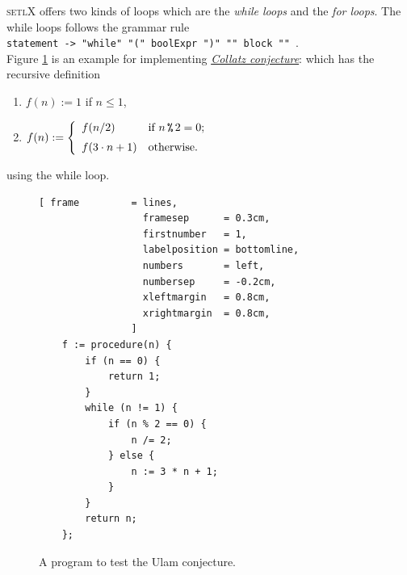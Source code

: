 \documentclass[11pt]{report}
\begin{document}
\textsc{setlX} offers two kinds of loops which are the \textsl{while loops} and the \textsl{for loops}. The while loops follows the grammar rule
\\[0.2cm]
\hspace*{1.3cm}
\texttt{statement -> "while" "(" boolExpr ")" "{" block "}" }.
\\[0.2cm]
Figure \ref{fig:ulam.stlx} is an example for implementing \href{http://en.wikipedia.org/wiki/Collatz_conjecture}{\emph{Collatz conjecture}}: which has the recursive definition
\begin{enumerate}
\item $f(n) := 1$ \hspace*{2.13cm} if $n \leq 1$,
\item $f(n) := \left\{
       \begin{array}[c]{ll}
         f(n/2)           & \mbox{if $n \,\texttt{\symbol{37}}\, 2 = 0$;} \\[0.2cm]  
         f(3 \cdot n + 1) & \mbox{otherwise.} 
       \end{array}
       \right.
      $ 
\end{enumerate}
using the while loop.
\begin{figure}[!ht]
\centering
\begin{Verbatim}[ frame         = lines, 
                  framesep      = 0.3cm, 
                  firstnumber   = 1,
                  labelposition = bottomline,
                  numbers       = left,
                  numbersep     = -0.2cm,
                  xleftmargin   = 0.8cm,
                  xrightmargin  = 0.8cm,
                ]
    f := procedure(n) {
        if (n == 0) {
            return 1;   
        }
        while (n != 1) {
            if (n % 2 == 0) {
                n /= 2;
            } else {
                n := 3 * n + 1;
            }
        }
        return n;
    };
\end{Verbatim}
\vspace*{-0.3cm}
\caption{A program to test the Ulam conjecture.}
\label{fig:ulam.stlx}
\end{figure}
\end{document}
